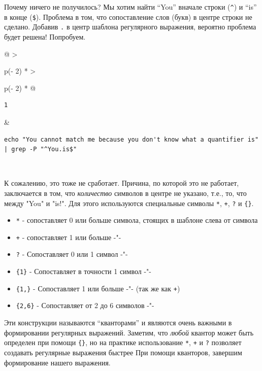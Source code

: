 \documentclass{article}
\begin{document}
Почему ничего не получилось? Мы хотим найти ``You'' вначале строки
(\texttt{\^{}}) и ``is'' в конце (\texttt{\$}). Проблема в том, что
сопоставление слов (букв) в центре строки не сделано. Добавив \texttt{.}
в центр шаблона регулярного выражения, вероятно проблема будет решена!
Попробуем.

\begin{longtable}[]{@{}
  >{\raggedright\arraybackslash}p{(\columnwidth - 2\tabcolsep) * }
  >{\raggedright\arraybackslash}p{(\columnwidth - 2\tabcolsep) * }@{}}
\toprule
\endhead
\begin{minipage}[t]{\linewidth}\raggedright
\begin{verbatim}
1
\end{verbatim}
\end{minipage} & \begin{minipage}[t]{\linewidth}\raggedright
\begin{verbatim}
echo "You cannot match me because you don't know what a quantifier is" | grep -P "^You.is$"
\end{verbatim}
\end{minipage} \\ \addlinespace
\bottomrule
\end{longtable}

К сожалению, это тоже не сработает. Причина, по которой это не работает,
заключается в том, что \emph{количество} символов в центре не указано,
т.е., то, что между "You" и "is!". Для этого используются специальные
символы \texttt{*}, \texttt{+}, \texttt{?} и \texttt{\{\}}.

\begin{itemize}
\tightlist
\item
  \texttt{*} - сопоставляет 0 или больше символа, стоящих в шаблоне
  слева от символа
\item
  \texttt{+} - сопоставляет 1 или больше -"-
\item
  \texttt{?} - Сопоставляет 0 или 1 символ -"-
\item
  \texttt{\{1\}} - Сопоставляет в точности 1 символ -"-
\item
  \texttt{\{1,\}} - Сопоставляет 1 или больше -"- (так же как
  \texttt{+})
\item
  \texttt{\{2,6\}} - Сопоставляет от 2 до 6 символов -"-
\end{itemize}

Эти конструкции называются ``кванторами'' и являются очень важными в
формировании регулярных выражений. Заметим, что \emph{любой} квантор
может быть определен при помощи \texttt{\{\}}, но на практике
использование \texttt{*}, \texttt{+} и \texttt{?} позволяет создавать
регулярные выражения быстрее При помощи кванторов, завершим формирование
нашего выражения.
\end{document}
